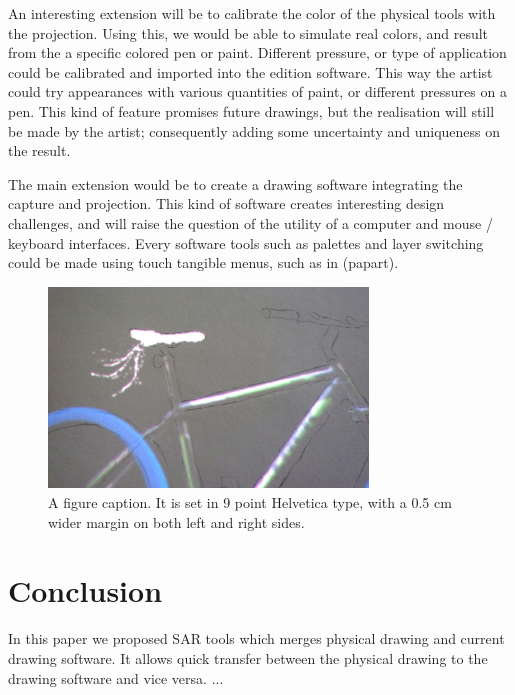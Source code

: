 \documentclass{article}
\begin{document}
An interesting extension will be to calibrate the color of the physical tools with the projection. Using this, we would be able to simulate real colors, and result from the a specific colored pen or paint. Different pressure, or type of application could be calibrated and imported into the edition software. This way the artist could try appearances with various quantities of paint, or different pressures on a pen. This kind of feature promises future drawings, but the realisation will still be made by the artist; consequently adding some uncertainty and uniqueness on the result. 

The main extension would be to create a drawing software integrating the capture and projection. This kind of software creates interesting design challenges, and will raise the question of the utility of a computer and mouse / keyboard interfaces. Every software tools such as palettes and layer switching could be made using touch tangible menus, such as in (papart). 

\begin{figure}[b]
\includegraphics[width = 85mm]{velo4.JPG}
\caption{A figure caption.  It is set in 9 point Helvetica type, with a
0.5 cm wider margin on both left and right sides.} 
\label{fig:zoom}
\end{figure}

\section{Conclusion}

In this paper we proposed SAR tools which merges physical drawing and current drawing software. It allows quick transfer between the physical drawing to the drawing software and vice versa. 
...





\end{document}
